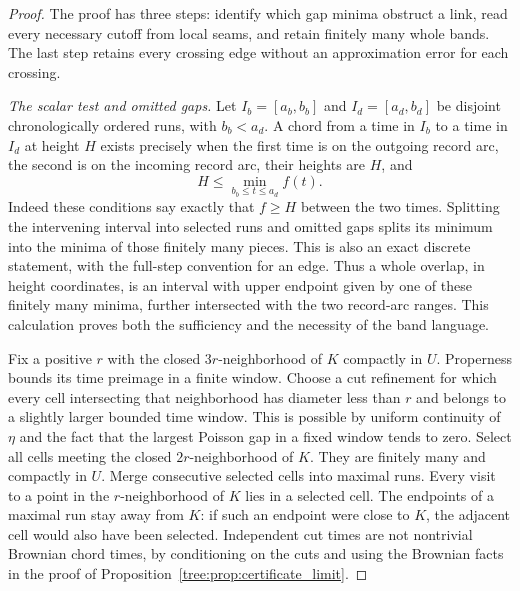 \begin{proof}
The proof has three steps: identify which gap minima obstruct a link,
read every necessary cutoff from local seams, and retain finitely many
whole bands. The last step retains every crossing edge without an
approximation error for each crossing.

\emph{The scalar test and omitted gaps.} Let
$I_b=[a_b,b_b]$ and $I_d=[a_d,b_d]$ be disjoint chronologically ordered
runs, with $b_b<a_d$.  A chord from a time in $I_b$ to a time in $I_d$
at height $H$ exists precisely when the first time is on the outgoing
record arc, the second is on the incoming record arc, their heights
are $H$, and
\begin{equation}\label{tree:eq:gap_minimum_condition}
 H\leq \min_{b_b\leq t\leq a_d}f(t).
\end{equation}
Indeed these conditions say exactly that $f\geq H$ between the two
times.  Splitting the intervening interval into selected runs and omitted
gaps splits its minimum into the minima of those finitely many pieces.
This is also an exact discrete statement, with the full-step convention
for an edge.  Thus a whole overlap, in height coordinates, is an interval
with upper endpoint given by one of these finitely many minima, further
intersected with the two record-arc ranges.  This calculation proves
both the sufficiency and the necessity of the band language.

Fix a positive $r$ with the closed $3r$-neighborhood of $K$ compactly
in $U$.  Properness bounds its time preimage in a finite window.  Choose
a cut refinement for which every cell intersecting that neighborhood
has diameter less than $r$ and belongs to a slightly larger bounded
time window.  This is possible by uniform continuity of $\eta$ and
the fact that the largest Poisson gap in a fixed window tends to zero.
Select all cells meeting the closed $2r$-neighborhood of $K$.
They are finitely many and compactly in $U$.  Merge consecutive selected
cells into maximal runs.  Every visit to a point in the $r$-neighborhood
of $K$ lies in a selected cell.  The endpoints of a maximal run stay
away from $K$: if such an endpoint were close to $K$, the adjacent cell
would also have been selected.  Independent cut times are not nontrivial
Brownian chord times, by conditioning on the cuts and using the
Brownian facts in the proof of Proposition~\ref{tree:prop:certificate_limit}.


\end{proof}
